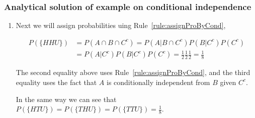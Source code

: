 \begin{frame}
    \frametitle{Analytical solution of example on conditional independence}

    \scriptsize
    \begin{enumerate}[a]

        \conti
        \item
            Next we will assign probabilities uing
            Rule~\ref{rule:assignProByCond},

            \begin{align*}
                P(\{HHU\})&=P(A\cap B\cap C^c)=P(A|B\cap C^c)P(B|C^c)P(C^c)\\
                          &=P(A|C^c)P(B|C^c)P(C^c)=\frac{1}{2}\frac{1}{2}\frac{1}{2}=\frac{1}{8}
            \end{align*}

            The second equality above uses Rule~\ref{rule:assignProByCond}, and
            the third equality uses the fact that $A$ is conditionally
            independent from $B$ given $C^c$.

            In the same way we can see that
            $P(\{HTU\})=P(\{THU\})=P(\{TTU\})=\frac{1}{8}$.

    \end{enumerate}
    \normalsize

\end{frame}

